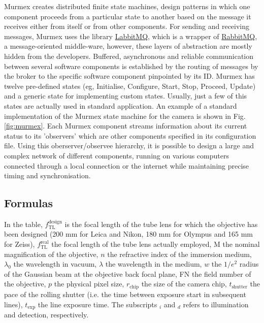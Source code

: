 \documentclass[12pt]{spieman}  %
\begin{document}
Murmex creates distributed finite state machines, design patterns in which one component proceeds from a particular state to another based on the message it receives either from itself or from other components. For sending and receiving messages, Murmex uses the library \href{http://sine.ni.com/nips/cds/view/p/lang/en/nid/211065}{LabbitMQ}, which is a wrapper of \href{http://www.rabbitmq.com/}{RabbitMQ}, a message-oriented middle-ware, however, these layers of abstraction are mostly hidden from the developers. %
Buffered, asynchronous and reliable communication between several software components is established by the routing of messages by the broker to the specific software component pinpointed by its ID. %
Murmex has twelve pre-defined states (eg, Initialise, Configure, Start, Stop, Proceed, Update) and a generic state for implementing custom states. Usually, just a few of this states are actually used in standard application. An example of a standard implementation of the Murmex state machine for the camera is shown in Fig. \ref{fig:murmex}. Each Murmex component streams information about its current status to its 'observers' which are other components specified in its configuration file. Using this oberserver/observee hierarchy, it is possible to design a large and complex network of different components, running on various computers connected through a local connection or the internet while maintaining precise timing and synchronisation. %



\subsection{Formulas}

In the table, $f_{\text{TL}}^{\text{design}}$ is the focal length of the tube lens for which the objective has been designed (200 mm for Leica and Nikon, 180 mm for Olympus and 165 mm for Zeiss), $f_{\text{TL}}^{\text{real}}$ the focal length of the tube lens actually employed, $\text{M}$ the nominal magnification of the objective, $n$ the refractive index of the immersion medium, $\lambda_0$ the wavelength in vacuum, $\lambda$ the wavelength in the medium, $w$ the $1/e^2$ radius of the Gaussian beam at the objective back focal plane, FN the field number of the objective, $p$ the physical pixel size, $r_{\text{chip}}$ the size of the camera chip, $t_{\text{shutter}}$ the pace of the rolling shutter (i.e. the time between exposure start in subsequent lines), $ t_{\text{exp}}$ the line exposure time. The subscripts $_i$ and $_d$ refers to illumination and detection, respectively.
\end{document}
